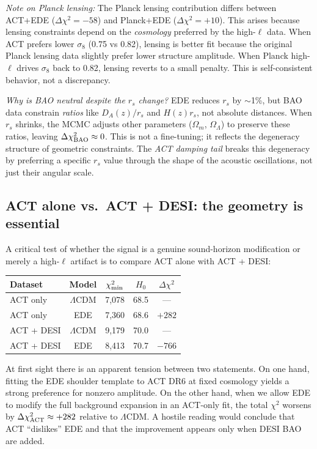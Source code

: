 \documentclass[twocolumn,showpacs,preprintnumbers,amsmath,amssymb,prd]{revtex4-2}
\newcommand{\lcdm}{$\Lambda$CDM}
\begin{document}
\emph{Note on Planck lensing:} The Planck lensing contribution differs between 
ACT+EDE ($\Delta\chi^2 = -58$) and Planck+EDE ($\Delta\chi^2 = +10$). This arises 
because lensing constraints depend on the \emph{cosmology} preferred by the 
high-$\ell$ data. When ACT prefers lower $\sigma_8$ (0.75 vs 0.82), lensing is 
better fit because the original Planck lensing data slightly prefer lower 
structure amplitude. When Planck high-$\ell$ drives $\sigma_8$ back to 0.82, 
lensing reverts to a small penalty. This is self-consistent behavior, not 
a discrepancy.

\emph{Why is BAO neutral despite the $r_s$ change?} EDE reduces $r_s$ by 
$\sim$1\%, but BAO data constrain \emph{ratios} like $D_A(z)/r_s$ and 
$H(z) r_s$, not absolute distances. When $r_s$ shrinks, the MCMC adjusts 
other parameters ($\Omega_m$, $\Omega_\Lambda$) to preserve these ratios, 
leaving $\Delta\chi^2_{\rm BAO} \approx 0$. This is not a fine-tuning; it 
reflects the degeneracy structure of geometric constraints. The \emph{ACT 
damping tail} breaks this degeneracy by preferring a specific $r_s$ value 
through the shape of the acoustic oscillations, not just their angular scale.

\subsection{ACT alone vs.\ ACT + DESI: the geometry is essential}
\label{sec:act_vs_desi}

A critical test of whether the signal is a genuine sound-horizon modification 
or merely a high-$\ell$ artifact is to compare ACT alone with ACT + DESI:

\begin{center}
\begin{tabular}{lcccc}
\toprule
Dataset & Model & $\chi^2_{\rm min}$ & $H_0$ & $\Delta\chi^2$ \\
\midrule
ACT only & \lcdm & 7{,}078 & 68.5 & --- \\
ACT only & EDE & 7{,}360 & 68.6 & $+282$ \\
ACT + DESI & \lcdm & 9{,}179 & 70.0 & --- \\
ACT + DESI & EDE & 8{,}413 & 70.7 & $-766$ \\
\bottomrule
\end{tabular}
\end{center}

At first sight there is an apparent tension between two statements. On one hand, 
fitting the EDE shoulder template to ACT DR6 at fixed cosmology yields a strong 
preference for nonzero amplitude. On the other hand, when we allow EDE to modify 
the full background expansion in an ACT-only fit, the total $\chi^2$ worsens by 
$\Delta\chi^2_{\rm ACT} \approx +282$ relative to \lcdm. A hostile reading would 
conclude that ACT ``dislikes'' EDE and that the improvement appears only when 
DESI BAO are added.
\end{document}
